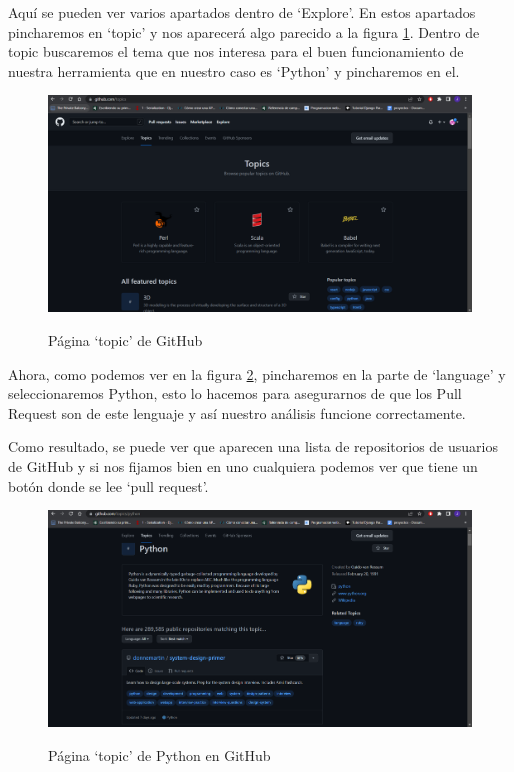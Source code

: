 \documentclass[a4paper, 12pt]{book}
\begin{document}
Aquí se pueden ver varios apartados dentro de `Explore'. En estos apartados pincharemos en `topic' y nos aparecerá algo parecido a la figura \ref{figura:git2}. Dentro de topic buscaremos el tema que nos interesa para el buen funcionamiento de nuestra herramienta que en nuestro caso es `Python' y pincharemos en el.

\begin{figure}
    \includegraphics[bb=0 0 800 600, width=12cm, keepaspectratio]{img/git2}
    \label{figura:git2}
    \caption{Página `topic' de GitHub}
 \end{figure}
 
Ahora, como podemos ver en la figura \ref{figura:git3}, pincharemos en la parte de `language' y seleccionaremos Python, esto lo hacemos para asegurarnos de que los Pull Request son de este lenguaje y así nuestro análisis funcione correctamente.

Como resultado, se puede ver que aparecen una lista de repositorios de usuarios de GitHub y si nos fijamos bien en uno cualquiera podemos ver que tiene un botón donde se lee `pull request'. 

\begin{figure}
    \includegraphics[bb=0 0 800 600, width=12cm, keepaspectratio]{img/git3}
    \label{figura:git3}
    \caption{Página `topic' de Python en GitHub}
 \end{figure}
 
\end{document}
